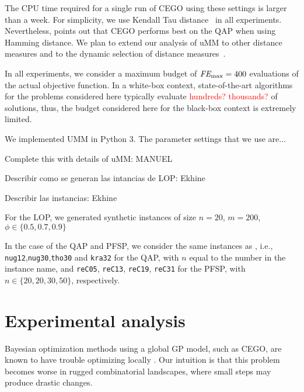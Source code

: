 \documentclass[runningheads]{llncs}
\begin{document}
The CPU time required for a single run of CEGO using these settings is larger
than a week.  For simplicity, we use Kendall Tau distance~\citep{?} in all
experiments. Nevertheless,
\citet{ZaeStoFriFisNauBar2014} points out that CEGO performs best on the QAP
when using Hamming distance. We plan to extend our analysis of uMM to other
distance measures and to the dynamic selection of distance
measures~\citep{ZaeStoBar2014:ppsn}.

In all experiments, we consider a maximum budget of $\textit{FE}_{\max}=400$ evaluations of
the actual objective function. In a white-box context, state-of-the-art
algorithms for the problems considered here typically evaluate
\textcolor{red}{hundreds? thousands?} of solutions, thus, the budget considered
here for the black-box context is extremely limited.

We implemented UMM in Python 3. The parameter settings that we use are...

Complete this with details of uMM: MANUEL



Describir como se generan las intancias de LOP: Ekhine

Describir las instancias: Ekhine

For the LOP, we generated synthetic instances of size $n=20$, $m=200$, $\phi\in\{0.5,0.7,0.9\}$

In the case of the QAP and PFSP, we consider the same instances as
\citet{ZaeStoFriFisNauBar2014,ZaeStoBar2014:ppsn}, i.e.,
\texttt{nug12},\texttt{nug30},\texttt{tho30} and \texttt{kra32} for the QAP,
with $n$ equal to the number in the instance name, and \texttt{reC05},
\texttt{reC13}, \texttt{reC19}, \texttt{reC31} for the PFSP, with
$n \in \{20, 20, 30, 50\}$, respectively.

\section{Experimental analysis}

Bayesian optimization methods using a global GP model, such as CEGO, are known
to have trouble optimizing locally \citep{EriPeaGar2019scalable}. Our
intuition is that this problem becomes worse in rugged combinatorial
landscapes, where small steps may produce drastic changes.
\end{document}
